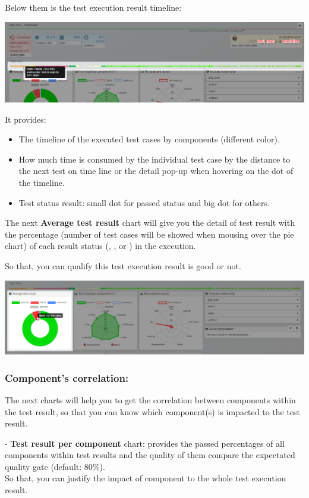 Below them is the test execution result timeline:

\includegraphics[width=1\linewidth]{./pictures/dashboard/result_timeline.png}

It provides:
\begin{itemize}
   \item The timeline of the executed test cases by components (different color).
   \item How much time is consumed by the individual test case by the distance 
         to the next test on time line or the detail pop-up when hovering on the 
         dot of the timeline.
   \item Test status result: small dot for passed status and big dot for others.
\end{itemize}


The next \textbf{Average test result} chart will give you the detail of test 
result with the percentage (number of test cases will be showed when mousing 
over the pie chart) of each result status (, , 
 or ) in the execution. 

So that, you can qualify this test execution result is good or not.

\includegraphics[width=1\linewidth]
{./pictures/dashboard/chart_average_test_result.png}

\subsubsection{Component's correlation:}
The next charts will help you to get the correlation between components within
the test result, so that you can know which component(s) is impacted to the test
result.

- \textbf{Test result per component} chart: provides the passed percentages of 
all components within test results and the quality of them compare the 
expectated quality gate (default: 80\%).\\
So that, you can justify the impact of component to the whole test execution
result.

